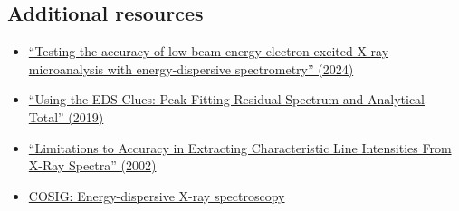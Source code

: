 \documentclass[letterpaper, 12pt]{article}
\begin{document}
\subsection*{Additional resources}

\begin{itemize}
    \setlength\itemsep{-0.5em}
    \item \href{https://doi.org/10.1007/s10853-024-10285-4}{``Testing the accuracy of low-beam-energy electron-excited X-ray microanalysis with energy-dispersive spectrometry'' (2024)}
    \item \href{https://doi.org/10.1017/S1431927619002964}{``Using the EDS Clues: Peak Fitting Residual Spectrum and Analytical Total'' (2019)}
    \item \href{https://doi.org/10.6028/jres.107.045}{``Limitations to Accuracy in Extracting Characteristic Line Intensities From X-Ray Spectra'' (2002)}
    \item \href{https://osf.io/shfjy}{COSIG: Energy-dispersive X-ray spectroscopy}
\end{itemize}
\end{document}
